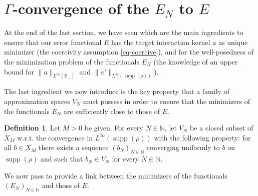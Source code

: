 \documentclass[A4paper,11pt]{article}
\theoremstyle{definition}
\newtheorem{definition}[theorem]{Definition}
\newcommand{\N}{\mathbb{N}}
\newcommand{\R}{\mathbb{R}}
\DeclareMathOperator{\supp}{supp}
\begin{document}
\section{$\Gamma$-convergence of the $E_N$ to $E$}

At the end of the last section, we have seen which are the main ingredients to ensure that our error functional $E$ has the target interaction kernel $a$ as unique minimizer (the coercivity assumption \eqref{eq-coercive}), and for the well-posedness of the minimization problem of the functionals $E_N$ (the knowledge of an upper bound for $\|a\|_{L^{\infty}(\R_+)}$ and $\|a'\|_{L^{\infty}(\supp(\rho))}$).

The last ingredient we now introduce is the key property that a family of approximation spaces $V_N$ must possess in order to ensure that the minimizers of the functionals $E_N$ are sufficiently close to those of $E$.

\begin{definition}\label{VNdef}
Let $M > 0$ be given. For every $N \in \N$, let $V_N$ be a closed subset of $X_M$ w.r.t. the convergence in $L^{\infty}(\supp(\rho))$ with the following property: for all $b\in X_M$ there exists a sequence $(b_N)_{N \in \N}$ converging uniformly to $b$ on $\supp(\rho)$ and such that $b_N\in V_N$ for every $N \in \N$.
\end{definition}

We now pass to provide a link between the minimizers of the functionals $(E_N)_{N \in \N}$ and those of $E$.
\end{document}
